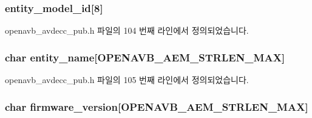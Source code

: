 \subsubsection[{\texorpdfstring{entity\+\_\+model\+\_\+id}{entity_model_id}}]{ entity\+\_\+model\+\_\+id\mbox{[}8\mbox{]}}\hypertarget{structopenavb__avdecc__cfg__t_a10141ef89fe144c95be49eeb9a34b2d1}{}\label{structopenavb__avdecc__cfg__t_a10141ef89fe144c95be49eeb9a34b2d1}


openavb\+\_\+avdecc\+\_\+pub.\+h 파일의 104 번째 라인에서 정의되었습니다.

\subsubsection[{\texorpdfstring{entity\+\_\+name}{entity_name}}]{\setlength{\rightskip}{0pt plus 5cm}char entity\+\_\+name\mbox{[}{\bf O\+P\+E\+N\+A\+V\+B\+\_\+\+A\+E\+M\+\_\+\+S\+T\+R\+L\+E\+N\+\_\+\+M\+AX}\mbox{]}}\hypertarget{structopenavb__avdecc__cfg__t_a287f7f53f991f5fea7fd405411dcfdc3}{}\label{structopenavb__avdecc__cfg__t_a287f7f53f991f5fea7fd405411dcfdc3}


openavb\+\_\+avdecc\+\_\+pub.\+h 파일의 105 번째 라인에서 정의되었습니다.

\subsubsection[{\texorpdfstring{firmware\+\_\+version}{firmware_version}}]{\setlength{\rightskip}{0pt plus 5cm}char firmware\+\_\+version\mbox{[}{\bf O\+P\+E\+N\+A\+V\+B\+\_\+\+A\+E\+M\+\_\+\+S\+T\+R\+L\+E\+N\+\_\+\+M\+AX}\mbox{]}}\hypertarget{structopenavb__avdecc__cfg__t_a473ae1645816e0b43a62c429ffa1c92d}{}\label{structopenavb__avdecc__cfg__t_a473ae1645816e0b43a62c429ffa1c92d}


